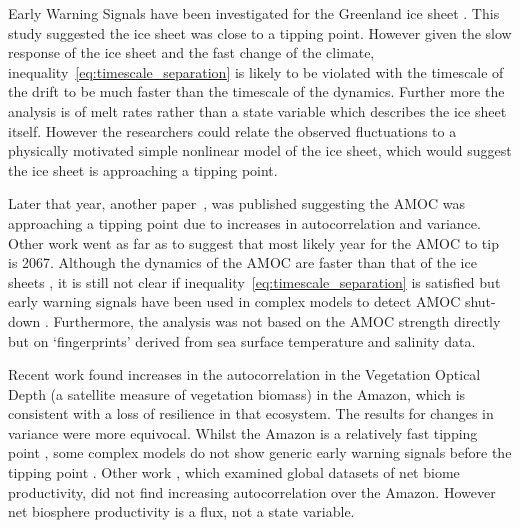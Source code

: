 Early Warning Signals have been investigated for the Greenland ice sheet \parencite{Boers2021}. This study suggested the ice sheet was close to a tipping point.
However given the slow response of the ice sheet and
the fast change of the climate, inequality~\ref{eq:timescale_separation} is likely to be violated with the timescale of the drift to be much faster than the timescale of the dynamics.
Further more the analysis is of melt rates
rather than a state variable which describes the ice sheet itself. However the researchers could relate the observed fluctuations to a physically motivated simple nonlinear model of the ice sheet,
which would suggest the ice sheet is approaching a tipping point.

Later that year, another paper~\cite{Boers2021a}, was published suggesting the AMOC was approaching a tipping point due to increases in autocorrelation and variance.
Other work \parencite{Ditlevsen2022arxiv} went as far
as to suggest that most likely year for the AMOC to tip is 2067. Although the dynamics of the AMOC are faster than that of the ice sheets \parencite{ArmstrongMcKay2022}, it is still not clear if
inequality~\ref{eq:timescale_separation} is satisfied but early warning signals have been used in complex models to detect AMOC shut-down \parencite{Boulton2014}.
Furthermore, the analysis was not based on the AMOC strength directly but on `fingerprints' derived from sea surface temperature and salinity data.

Recent work \parencite{Boulton2022} found increases in the autocorrelation in  the Vegetation Optical Depth (a satellite measure of vegetation biomass) in the Amazon,
which is consistent with a loss of resilience in that
ecosystem. The results for changes in variance were more equivocal. Whilst the Amazon is a relatively fast tipping point \parencite{Ritchie2021}, some complex models do not show
generic early warning signals before the
tipping point \parencite{Boulton2013}. Other work \parencite{Fernandez-Martinez2023}, which examined global datasets of net biome productivity, did not find increasing autocorrelation
over the Amazon. However net biosphere productivity is a flux, not a state variable.